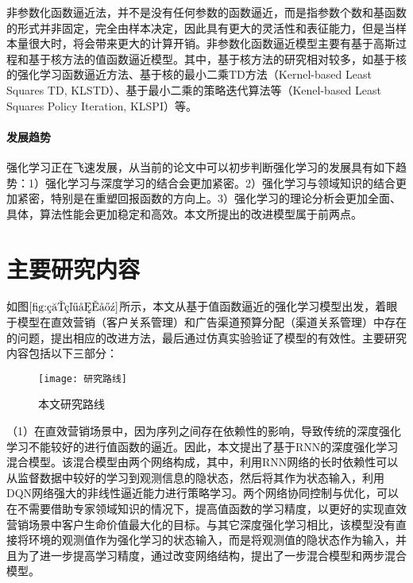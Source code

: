 非参数化函数逼近法，并不是没有任何参数的函数逼近，而是指参数个数和基函数的形式并非固定，完全由样本决定，因此具有更大的灵活性和表征能力，但是当样本量很大时，将会带来更大的计算开销。非参数化函数逼近模型主要有基于高斯过程和基于核方法的值函数逼近模型。其中，基于核方法的研究相对较多，如基于核的强化学习函数逼近方法\citep{ormoneit2002kernel}、基于核的最小二乘TD方法（Kernel-based Least Squares TD, KLSTD）\citep{xu2005kernel}、基于最小二乘的策略迭代算法等（Kenel-based Least Squares Policy Iteration, KLSPI）\citep{xu2007kernel}等。

\paragraph{发展趋势}
强化学习正在飞速发展，从当前的论文中可以初步判断强化学习的发展具有如下趋势：1）强化学习与深度学习的结合会更加紧密。2）强化学习与领域知识的结合更加紧密，特别是在重塑回报函数的方向上。3）强化学习的理论分析会更加全面、具体，算法性能会更加稳定和高效。本文所提出的改进模型属于前两点。

\section{主要研究内容}
如图$\ref{fig:研究内容}$所示，本文从基于值函数逼近的强化学习模型出发，着眼于模型在直效营销（客户关系管理）和广告渠道预算分配（渠道关系管理）中存在的问题，提出相应的改进方法，最后通过仿真实验验证了模型的有效性。主要研究内容包括以下三部分：
\begin{figure}[htbp]
\centering
\texttt{[image: 研究路线]}
\caption{本文研究路线}
\label{fig:研究内容}
\end{figure}

（1）在直效营销场景中，因为序列之间存在依赖性的影响，导致传统的深度强化学习不能较好的进行值函数的逼近。因此，本文提出了基于RNN的深度强化学习混合模型。该混合模型由两个网络构成，其中，利用RNN网络的长时依赖性可以从监督数据中较好的学习到观测信息的隐状态，然后将其作为状态输入，利用DQN网络强大的非线性逼近能力进行策略学习。两个网络协同控制与优化，可以在不需要借助专家领域知识的情况下，提高值函数的学习精度，以更好的实现直效营销场景中客户生命价值最大化的目标。与其它深度强化学习相比，该模型没有直接将环境的观测值作为强化学习的状态输入，而是将观测值的隐状态作为输入，并且为了进一步提高学习精度，通过改变网络结构，提出了一步混合模型和两步混合模型。

